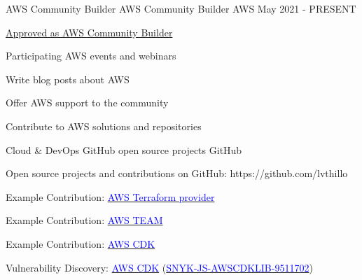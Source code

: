 \newpage
{}


\begin{cventries}

  \cventry
    {AWS Community Builder} %
    {AWS Community Builder} %
    {AWS} %
    {May 2021 - PRESENT} %
    {
      \begin{cvitems} %
        \item {\href{https://shorturl.at/bN2Cn}{Approved as AWS Community Builder}} %
        \item {Participating AWS events and webinars}
        \item {Write blog posts about AWS}
        \item {Offer AWS support to the community}
        \item {Contribute to AWS solutions and repositories}
      \end{cvitems}
    }

  \cventry
    {Cloud \& DevOps} %
    {GitHub open source projects} %
    {GitHub} %
    {} %
    {
      \begin{cvitems} %
        \item {Open source projects and contributions on GitHub: https://github.com/lvthillo}
        \item {Example Contribution: \href{https://github.com/hashicorp/terraform-provider-aws/pull/22104}{\textcolor{blue}{AWS Terraform provider}}}
        \item {Example Contribution: \href{https://github.com/aws-samples/iam-identity-center-team/pull/62}{\textcolor{blue}{AWS TEAM}}}
        \item {Example Contribution: \href{https://github.com/aws/aws-cdk/pull/34830}{\textcolor{blue}{AWS CDK}}}
        \item {Vulnerability Discovery: \href{https://github.com/aws/aws-cdk/issues/33709}{\textcolor{blue}{AWS CDK}} (\href{https://security.snyk.io/vuln/SNYK-JS-AWSCDKLIB-9511702}{\textcolor{blue}{SNYK-JS-AWSCDKLIB-9511702}})}
      \end{cvitems}
    }


\end{cventries}
